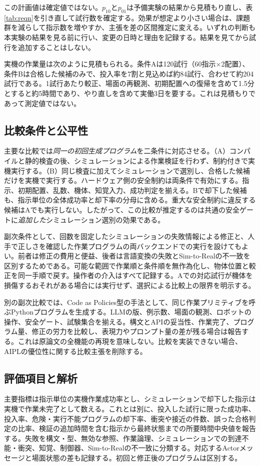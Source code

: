 \documentclass[10pt,letterpaper]{article}
\begin{document}
この計画値は確定値ではない。$p_{10}$と$p_{01}$は予備実験の結果から見積もり直し、表\ref{tab:reqn}を引き直して試行数を確定する。効果が想定より小さい場合は、課題群を減らして指示数を増やすか、主張を差の区間推定に変える。いずれの判断も本実験の結果を見る前に行い、変更の日時と理由を記録する。結果を見てから試行を追加することはしない。

実機の作業量は次のように見積もられる。条件Aは120試行（60指示$\times$2配置）、条件Bは合格した候補のみで、投入率を7割と見込めば約84試行、合わせて約204試行である。1試行あたり較正、場面の再観測、初期配置への復帰を含めて1.5分とすると約5時間であり、やり直しを含めて実働3日を要する。これは見積もりであって測定値ではない。

\subsection{比較条件と公平性}
主要な比較では\emph{同一の初回生成プログラム}を二条件に対応させる。（A）コンパイルと静的検査の後、シミュレーションによる作業検証を行わず、制約付きで実機実行する。（B）同じ検査に加えてシミュレーションで選別し、合格した候補だけを実機で実行する。ハードウェア側の安全制約は両条件で有効にする。指示、初期配置、乱数、機体、知覚入力、成功判定を揃える。Bで却下した候補も、指示単位の全体成功率と却下率の分母に含める。重大な安全制約に違反する候補はAでも実行しない。したがって、この比較が推定するのは共通の安全ゲートに\emph{追加した}シミュレーション選別の効果である。

副次条件として、回数を固定したシミュレーションの失敗情報による修正と、人手で正しさを確認した作業プログラムの両バックエンドでの実行を設けてもよい。前者は修正の費用と便益、後者は言語変換の失敗とSim-to-Realの不一致を区別するためである。可能な範囲で作業順と条件順を無作為化し、物体位置と較正を同一手順で戻す。操作者の介入はすべて記録する。Aでの対応試行が機体を損傷するおそれがある場合には実行せず、選択による比較上の限界を明示する。

別の副次比較では、Code as Policies型の手法として、同じ作業プリミティブを呼ぶPythonプログラムを生成する\cite{liang2022}。LLMの版、例示数、場面の観測、ロボットの操作、安全ゲート、試験集合を揃える。構文とAPIの妥当性、作業完了、プログラム量、修正の労力を比較し、表現力やプロンプト量の差が残る場合は報告する。これは原論文の全機能の再現を意味しない。比較を実装できない場合、AIPLの優位性に関する比較主張を削除する。

\subsection{評価項目と解析}
主要指標は指示単位の実機作業成功率とし、シミュレーションで却下した指示は実機で作業未完了として数える。これとは別に、投入した試行に限った成功率、投入率、危険・実行不能プログラムの却下率、衝突や接近の件数、誤った合格判定の比率、検証の追加時間を含む指示から最終状態までの所要時間中央値を報告する。失敗を構文・型、無効な参照、作業論理、シミュレーションでの到達不能・衝突、知覚、制御器、Sim-to-Realの不一致に分類する。対応するActorメッセージと場面状態の差も記録する。初回と修正後のプログラムは区別する。
\end{document}
